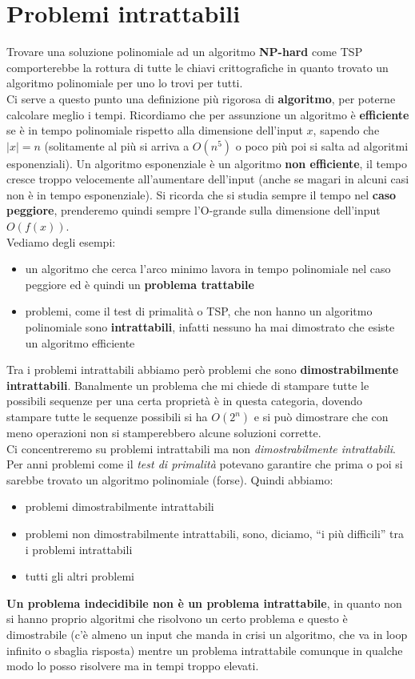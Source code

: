 \documentclass[a4paper,12pt, oneside]{book}
\begin{document}
\section{Problemi intrattabili}
Trovare una soluzione polinomiale ad un algoritmo \textbf{NP-hard} come TSP
comporterebbe la rottura di tutte le chiavi crittografiche in quanto trovato un
algoritmo polinomiale per uno lo trovi per tutti.\\
Ci serve a questo punto una definizione più rigorosa di \textbf{algoritmo}, per
poterne calcolare meglio i tempi. Ricordiamo che per assunzione un algoritmo è
\textbf{efficiente} se è in tempo polinomiale rispetto alla dimensione
dell'input $x$, sapendo che $|x|=n$ (solitamente al più si arriva a $O(n^5)$ o
poco più poi si salta ad algoritmi esponenziali). Un algoritmo esponenziale è un
algoritmo \textbf{non efficiente}, il tempo cresce troppo velocemente
all'aumentare dell'input (anche se magari in alcuni casi non è in tempo
esponenziale). Si ricorda che si studia sempre il tempo nel 
\textbf{caso peggiore}, prenderemo quindi sempre l'O-grande sulla dimensione
dell'input $O(f(x))$.\\
Vediamo degli esempi:
\begin{itemize}
  \item un algoritmo che cerca l'arco minimo lavora in tempo polinomiale nel
  caso peggiore ed è quindi un \textbf{problema trattabile}
  \item problemi, come il test di primalità o TSP, che non hanno un algoritmo
  polinomiale sono \textbf{intrattabili}, infatti nessuno ha mai dimostrato che
  esiste un algoritmo efficiente
\end{itemize}
Tra i problemi intrattabili abbiamo però problemi che sono
\textbf{dimostrabilmente intrattabili}. Banalmente un problema che mi chiede di
stampare tutte le possibili sequenze per una certa proprietà è in questa
categoria, dovendo stampare tutte le sequenze possibili si ha $O(2^n)$ e si può
dimostrare che con meno operazioni non si stamperebbero alcune soluzioni
corrette.\\
Ci concentreremo su problemi intrattabili ma non \textit{dimostrabilmente
  intrattabili}.\\
Per anni problemi come il \textit{test di primalità} potevano garantire che
prima o poi si sarebbe trovato un algoritmo polinomiale (forse). Quindi abbiamo:
\begin{itemize}
  \item problemi dimostrabilmente intrattabili
  \item problemi non dimostrabilmente intrattabili, sono, diciamo, ``i più
  difficili'' tra i problemi intrattabili
  \item tutti gli altri problemi
\end{itemize}
\textbf{Un problema indecidibile non è un problema intrattabile}, in quanto non
si hanno proprio algoritmi che risolvono un certo problema e questo è
dimostrabile (c'è almeno un input che manda in crisi un algoritmo, che va in
loop infinito o sbaglia risposta) mentre un problema intrattabile comunque in
qualche modo lo posso risolvere ma in tempi troppo elevati.
\end{document}
